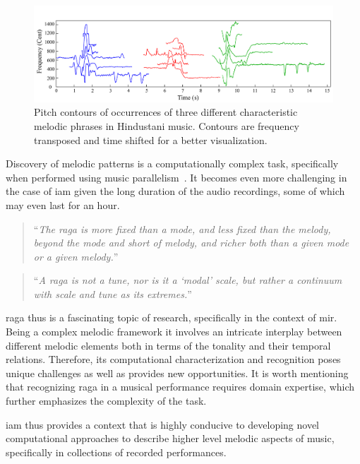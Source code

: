 \begin{figure}
	\begin{center}
		\includegraphics[width=\figSizeHundred]{ch01_introduction/figures/phraseClassesExample.pdf}
	\end{center}
	\caption[Examples of the characteristic melodic phrases in Hindustani Music]{Pitch contours of occurrences of three different characteristic melodic phrases in Hindustani music. Contours are frequency transposed and time shifted for a better visualization.}
	\label{fig:phraseComplexityExample_intro}
\end{figure}

Discovery of melodic patterns is a computationally complex task, specifically when performed using music parallelism~\citep{Cambouropoulos2006}. It becomes even more challenging in the case of \gls{iam} given the long duration of the audio recordings, some of which may even last for an hour.

\blockcquote[p. 96]{martinez2001semiosis}{``\textit{The \gls{raga} is more fixed than a mode, and less fixed than the melody, beyond the mode and short of melody, and richer both than a given mode or a given melody.}''}


\blockcquote[]{powers1963background}{``\textit{A \gls{raga} is not a tune, nor is it a `modal' scale, but rather a continuum with scale and tune as its extremes.}''}

\Gls{raga} thus is a fascinating topic of research, specifically in the context of \gls{mir}. Being a complex melodic framework it involves an intricate interplay between different melodic elements both in terms of the tonality and their temporal relations. Therefore, its computational characterization and recognition poses unique challenges as well as provides new opportunities. It is worth mentioning that recognizing \gls{raga} in a musical performance requires domain expertise, which further emphasizes the complexity of the task.

\gls{iam} thus provides a context that is highly conducive to developing novel computational approaches to describe higher level melodic aspects of music, specifically in collections of recorded performances. 


